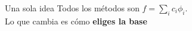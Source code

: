 \documentclass[aspectratio=169,11pt]{beamer}
\begin{document}
\begin{frame}{Una sola idea}
  \vspace{1cm}
  \fontsize{16}{18}\selectfont
  Todos los m\'etodos son $\displaystyle f = \sum_i c_i\phi_i$.\\[8pt]
  Lo que cambia es c\'omo \textbf{eliges la base}

\end{frame}
\end{document}
